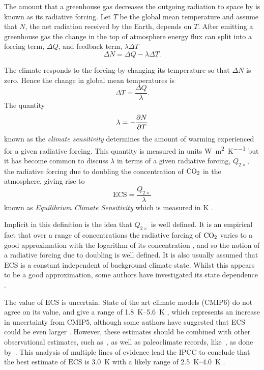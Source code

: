 The amount that a greenhouse gas decreases the outgoing radiation to space by is known as its radiative forcing. Let $T$ be
the global mean temperature and assume that $N$, the net radiation received by the Earth, depends on $T$. After emitting a greenhouse gas
the change in the top of atmosphere energy flux can split \parencite{Gregory2004} into a forcing term, $\Delta Q$, and feedback term, $\lambda \Delta T$
\begin{equation}
  \label{eq:deltaN}
  \Delta N = \Delta Q - \lambda \Delta T.
\end{equation}

The climate responds to the forcing by changing its temperature so that $\Delta N$ is zero. Hence the change in global mean temperatures is
\begin{equation}
  \label{eq:response_to_radiative_forcing}
  \Delta T = \frac{\Delta Q}{\lambda}.
\end{equation}
The quantity
\begin{equation}
  \label{eq:climate_sensitivity}
  \lambda = -\pdv{N}{T}
\end{equation}
known as the \emph{climate sensitivity} determines the amount of warming experienced for a given radiative forcing. This quantity is measured
in units \si{\watt\per\square\meter\per\kelvin} but it has become common to discuss $\lambda$ in terms of a given radiative forcing, $Q_{2\times}$,
the radiative forcing due to doubling the concentration of $\ce{CO2}$ in the atmosphere, giving rise to
\begin{equation}
  \label{eq:definition_of_ECS}
  \mathrm{ECS} = \frac{Q_{2\times}}{\lambda}
\end{equation}
known as \emph{Equilibrium Climate Sensitivity} which is measured in \si{\kelvin} \parencite{Charney1979}.

Implicit in this definition is the idea that $Q_{2\times}$ is well defined. It is an empirical fact that over a range of concentrations the radiative forcing
of $\ce{CO2}$ varies to a good approximation with the logarithm of its concentration \parencite{Pierrehumbert2010}, and so the notion of a radiative forcing due to doubling is well defined.
It is also usually assumed that $\mathrm{ECS}$ is a constant independent of background climate state. Whilst this appears to be a good approximation, some authors
have investigated its state dependence \parencite{Ashwin2019,Caballero2013}. %

The value of $\mathrm{ECS}$ is uncertain. State of the art climate models (CMIP6) do not agree on its value, and give a range of
\SIrange{1.8}{5.6}{\kelvin} \parencite{Zelinka2020}, which represents an increase in uncertainty from CMIP5, although some authors have suggested that ECS could be even
larger \parencite{Stainforth2005}.
However, these estimates should be combined with other observational estimates, such as~\cite{Cox2018}, as well as paleoclimate records, like~\cite{Hargreaves2012}, as done by~\cite{Sherwood2020}.
This analysis of multiple lines of evidence lead the IPCC to conclude that the best estimate of $\mathrm{ECS}$ is \SI{3.0}{\kelvin} with a likely range of \SIrange{2.5}{4.0}{\kelvin} \parencite{AR6}.


